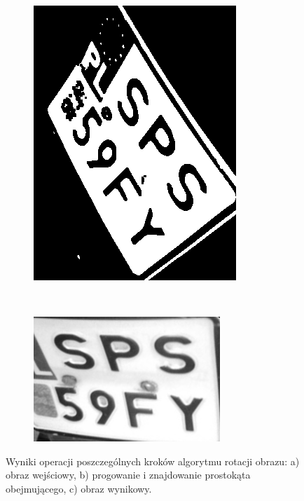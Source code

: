 \begin{figure}
\begin{subfigure}[b]{0.45\textwidth}
    \includegraphics[width=\textwidth]{img/detect-image-angle-threshold}
    \label{fig:rzut_liczba_linii_dwa}
    \caption{}
  \end{subfigure}
  ~
  \begin{subfigure}[b]{0.45\textwidth}
    \includegraphics[width=\textwidth]{img/detect-image-angle-output}
    \label{fig:rzut_liczba_linii_dwa}
    \caption{}
  \end{subfigure}
  \caption{Wyniki operacji poszczególnych kroków algorytmu rotacji obrazu: a) obraz wejściowy, b) progowanie i znajdowanie prostokąta obejmującego, c) obraz wynikowy.}
  \label{fig:detect_image_angle}
\end{figure}


